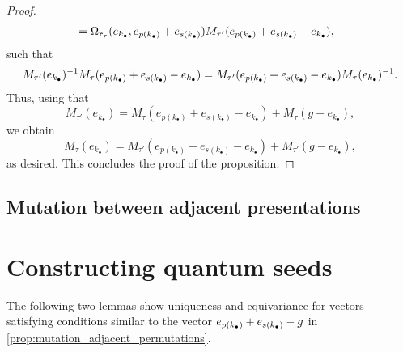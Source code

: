 \begin{proof}
\begin{align*}
		 & = \Omega_{\mathbf{r}_{\tau}}(e_{k_\bullet}, e_{p(k_\bullet)} + e_{s(k_\bullet)}) M_{\tau'}(e_{p(k_\bullet)} + e_{s(k_\bullet)} - e_{k_\bullet}),
	\end{align*}
	such that
	\begin{equation*}
		M_{\tau'}(e_{k_\bullet})^{-1} M_\tau(e_{p(k_\bullet)} + e_{s(k_\bullet)} - e_{k_\bullet}) = M_{\tau'}(e_{p(k_\bullet)} + e_{s(k_\bullet)} - e_{k_\bullet})M_\tau(e_{k_\bullet})^{-1}.
	\end{equation*}
	Thus, using that
	\begin{equation*}
		M_{\tau'}(e_{k_\bullet}) = M_{\tau}(e_{p(k_\bullet)}+e_{s(k_\bullet)}-e_{k_\bullet}) + M_{\tau}(g-e_{k_\bullet}),
	\end{equation*}
	we obtain
	\begin{equation*}
		M_{\tau}(e_{k_\bullet}) = M_{\tau'}(e_{p(k_\bullet)}+e_{s(k_\bullet)}-e_{k_\bullet}) + M_{\tau'}(g-e_{k_\bullet}),
	\end{equation*}
	as desired. This concludes the proof of the proposition.
\end{proof}

\subsection{Mutation between adjacent presentations}

\section{Constructing quantum seeds}
The following two lemmas show uniqueness and equivariance for vectors satisfying
conditions similar to the vector $e_{p(k_\bullet)} + e_{s(k_\bullet)} - g$ in
\cref{prop:mutation_adjacent_permutations}.

